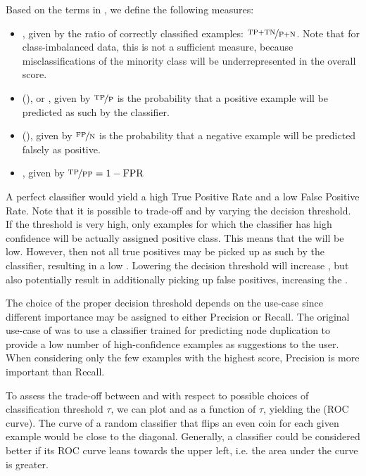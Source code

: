\documentclass[
	fontsize=10pt, %
	twoside=false, %
	secnumdepth=1, %
  toc=indentunnumbered %
]{kaobook}
\begin{document}
Based on the terms in , we define the following measures:
\begin{itemize}
\item {}, given by the ratio of
  correctly classified examples: $\nicefrac{\TP{} + \TN{}}{\P{}+\N{}}$. Note that for
  class-imbalanced data, this is not a sufficient measure, because
  misclassifications of the minority class will be underrepresented in the
  overall score.
\item  {} (\TPR{}), or , given by $\nicefrac{\TP{}}{\P{}}$ is
  the probability that a positive example will be predicted as such by the classifier.
\item {} (\FPR{}), given by $\nicefrac{\FP{}}{\N{}}$ is the
  probability that a negative example will be predicted falsely as positive.
  \item {}, given by $\nicefrac{\TP{}}{\PP{}} = 1 - \FPR{}$
\end{itemize}

A perfect classifier would yield a high True Positive Rate and a low False
Positive Rate.
%
Note that it is possible to trade-off \FPR{} and \TPR{}
by varying the decision threshold. If the threshold is very high, only examples
for which the classifier has high confidence will be actually assigned positive
class. This means that the \FPR{} will be low. However, then not all true
positives may be picked up as such by the classifier, resulting in a low \TPR{}.
Lowering the decision threshold will increase \TPR{}, but also potentially result
in additionally picking up false positives, increasing the \FPR{}.

The choice of the proper decision threshold
depends on the use-case since different importance may be assigned
to either Precision or Recall.
%
The original use-case of \nielsen{} was to use a classifier trained for predicting
node duplication to provide a low number of high-confidence examples as
suggestions to the user. When considering only the few examples with the highest
score, Precision is more important than Recall.

To assess the trade-off between \FPR{} and \TPR{} with respect to possible choices of
classification threshold $\tau$, we can plot \FPR{} and \TPR{} as a function of
$\tau$, yielding the  (ROC curve). The
curve of a random classifier that flips an even coin for each given example would
be close to the diagonal. 
%
Generally, a classifier could be considered better if its ROC curve leans
towards the upper left, i.e. the area under the curve is greater.
\end{document}
